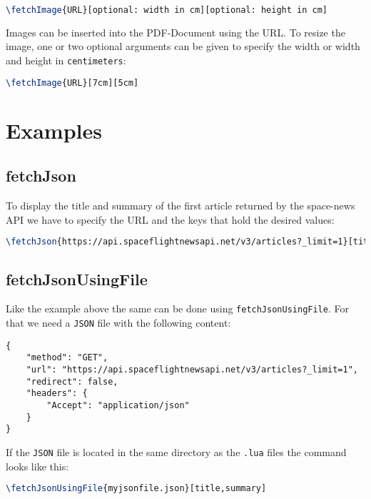 \documentclass[11pt]{article}
\begin{document}
\begin{lstlisting}[language=tex]
\fetchImage{URL}[optional: width in cm][optional: height in cm]
\end{lstlisting}

Images can be inserted into the PDF-Document using the URL. To resize the image, one or two optional arguments can be given to specify the width or width and height in \texttt{centimeters}:

\begin{lstlisting}[language=tex]
\fetchImage{URL}[7cm][5cm]
\end{lstlisting}

\section{Examples}

\subsection{fetchJson}

To display the title and summary of the first article returned by the space-news API we have to specify the URL and the keys that hold the desired values:

\begin{lstlisting}[language=tex]
\fetchJson{https://api.spaceflightnewsapi.net/v3/articles?_limit=1}[title,summary]
\end{lstlisting}

\subsection{fetchJsonUsingFile}
Like the example above the same can be done using \texttt{fetchJsonUsingFile}. For that we need a \texttt{JSON} file with the following content:

\begin{lstlisting}
{
    "method": "GET",
    "url": "https://api.spaceflightnewsapi.net/v3/articles?_limit=1",
    "redirect": false,
    "headers": {
        "Accept": "application/json"
    }
}
\end{lstlisting}

If the \texttt{JSON} file is located in the same directory as the \texttt{.lua} files the command looks like this:

\begin{lstlisting}[language=tex]
\fetchJsonUsingFile{myjsonfile.json}[title,summary]
\end{lstlisting}
\end{document}
